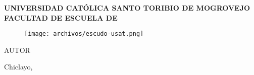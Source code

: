 \pagestyle{empty}
\begin{center}\bf
UNIVERSIDAD CATÓLICA SANTO TORIBIO DE MOGROVEJO\break
FACULTAD DE \MakeUppercase{\Facultad}\break
ESCUELA DE\MakeUppercase{\Escuela}

\begin{figure}[h]
    \centering\texttt{[image: archivos/escudo-usat.png]}
\end{figure}

{\large\TituloProyecto}\break\break
AUTOR\break
{\Autor}\break

Chiclayo,\Fecha
\end{center}

\newpage

\begin{center}
\renewcommand\contentsname{\large Índice}
\tableofcontents

\newpage

\renewcommand\listtablename{\large Lista de tablas}
\listoftables

\newpage

\renewcommand\listfigurename{\large Lista de figuras}
\listoffigures

\newpage

\listofannexes
\end{center}
\newpage

\pagestyle{fancy}
